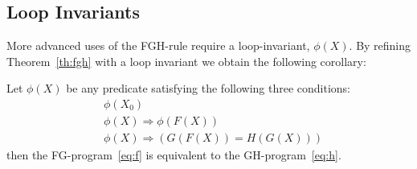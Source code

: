 
%

\subsection{Loop Invariants}

\label{subsec:loop:invariants}

More advanced uses of the FGH-rule require a loop-invariant,
$\phi(X)$.  By refining Theorem~\ref{th:fgh} with a loop invariant we
obtain the following corollary:

\begin{corollary}\label{cor:invariant}
  Let $\phi(X)$ be any predicate satisfying the
  following three conditions:
%
  \begin{align}
    & \phi(X_0) \label{eq:invariant:0}\\
    & \phi(X) \Rightarrow  \phi(F(X)) \label{eq:invariant:1}\\
    & \phi(X) \Rightarrow \left(G(F(X)) =  H(G(X))\right) \label{eq:invariant:2}
  \end{align}
%
  then the FG-program~\eqref{eq:f} is equivalent to the
  GH-program~\eqref{eq:h}.
\end{corollary}

